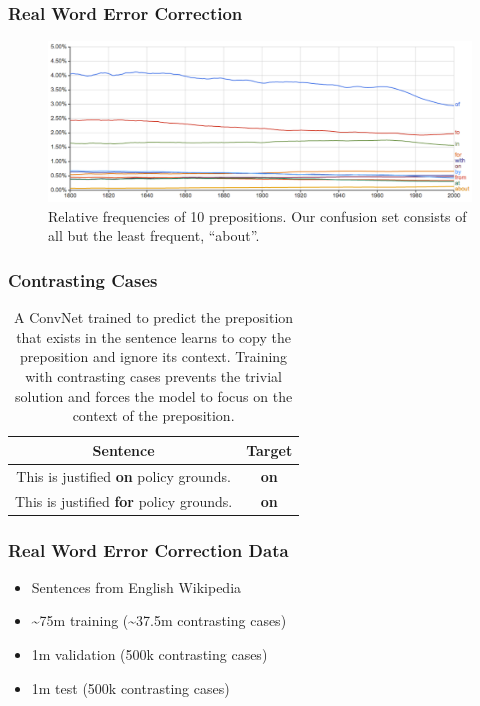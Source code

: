 \begin{frame}
\frametitle{Real Word Error Correction} 
\centering
\begin{figure}
    \centering
    \includegraphics[width=\textwidth]{figures/chapter06/preposition-frequencies}
    \caption{Relative frequencies of 10 prepositions.  Our confusion set consists of all but the least frequent, ``about''.}
\end{figure}
\end{frame}

\begin{frame}
\frametitle{Contrasting Cases}
\begin{table}
\begin{tabular}{cc}
\textbf{Sentence} & \textbf{Target} \\
\hline
This is justified \textbf{on} policy grounds. & \textbf{on} \\
This is justified \textbf{for} policy grounds. & \textbf{on} \\
\hline
\end{tabular}
\caption{A ConvNet trained to predict the preposition that exists in the sentence learns to copy the preposition and ignore its context.  Training with contrasting cases prevents the trivial solution and forces the model to focus on the context of the preposition.} 
\end{table}
\end{frame}

\begin{frame}
\frametitle{Real Word Error Correction Data}
\begin{itemize}
    \item Sentences from English Wikipedia 
    \item {\textasciitilde}75m training ({\textasciitilde}37.5m contrasting cases)
    \item 1m validation (500k contrasting cases) 
    \item 1m test (500k contrasting cases) 
\end{itemize}
\end{frame}

